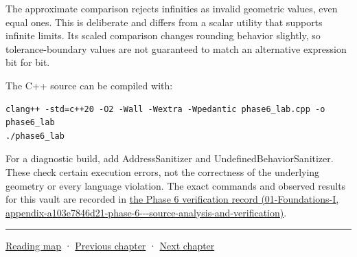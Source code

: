 The approximate comparison rejects infinities as invalid geometric values, even equal ones. This is deliberate and differs from a scalar utility that supports infinite limits. Its scaled comparison changes rounding behavior slightly, so tolerance-boundary values are not guaranteed to match an alternative expression bit for bit.

The C++ source can be compiled with:

\begin{verbatim}
clang++ -std=c++20 -O2 -Wall -Wextra -Wpedantic phase6_lab.cpp -o phase6_lab
./phase6_lab
\end{verbatim}

For a diagnostic build, add AddressSanitizer and UndefinedBehaviorSanitizer. These check certain execution errors, not the correctness of the underlying geometry or every language violation. The exact commands and observed results for this vault are recorded in \href{../01-Foundations-I/main.pdf\#nameddest=appendix-a103e7846d21-phase-6---source-analysis-and-verification}{the Phase 6 verification record (01-Foundations-I, appendix-a103e7846d21-phase-6-\/-\/-source-analysis-and-verification)}.

\begin{center}\rule{0.5\linewidth}{0.5pt}\end{center}

\hyperref[volume-reading-map]{Reading map} · \hyperref[02-foundations-ii-ch036]{Previous chapter} · \hyperref[02-foundations-ii-ch038]{Next chapter}
